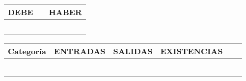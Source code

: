 \documentclass{article}
\begin{document}
\begin{table}[H]
    \centering
    \begin{tabular}{|p{3cm}|p{6cm}|p{3cm}|}
    \hline
    \textbf{DEBE} & \textbf{} & \textbf{HABER} \\
    \hline
    & & \\
    \hline
    & & \\
    \hline
    & & \\
    \hline
    & & \\
    \hline
    & & \\
    \hline
    \end{tabular}
\end{table}

\begin{table}[H]
    \centering
    \begin{tabular}{|c|c|c|c|c|c|c|c|c|c|c|c}
        \hline
        \textbf{Categoría}  & \multicolumn{3}{c|}{\textbf{ENTRADAS}} & \multicolumn{3}{c|}{\textbf{SALIDAS}} & \multicolumn{3}{c|}{\textbf{EXISTENCIAS}} \\  \hline
        & & & & & & & & & \\
        \hline
        & & & & & & & & & \\
        \hline
        & & & & & & & & & \\
        \hline
        & & & & & & & & & \\
        \hline
        & & & & & & & & & \\
        \hline
        & & & & & & & & & \\
        \hline
        
    \end{tabular}    
\end{table}
\end{document}
